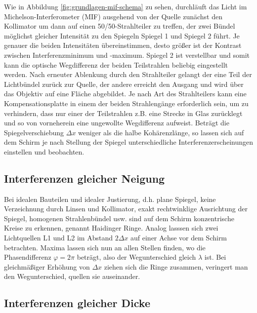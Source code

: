		Wie in Abbildung \ref{fig:grundlagen-mif-schema} zu sehen, durchläuft das Licht im Michelson-Interferometer (MIF) ausgehend von der Quelle zunächst den Kollimator um dann auf einen 50/50-Strahlteiler zu treffen, der zwei Bündel möglichst gleicher Intensität zu den Spiegeln Spiegel 1 und Spiegel 2 führt.
		Je genauer die beiden Intensitäten übereinstimmen, desto größer ist der Kontrast zwischen Interferenzminimum und -maximum. 
		Spiegel 2 ist verstellbar und somit kann die optische Wegdifferenz der beiden Teilstrahlen beliebig eingestellt werden.
		Nach erneuter Ablenkung durch den Strahlteiler gelangt der eine Teil der Lichtbündel zurück zur Quelle, der andere erreicht den Ausgang und wird über das Objektiv auf eine Fläche abgebildet.
		Je nach Art des Strahlteilers kann eine Kompensationsplatte in einem der beiden Strahlengänge erforderlich sein, um zu verhindern, dass nur einer der Teilstrahlen z.B. eine Strecke in Glas zurücklegt und so von vorneherein eine ungewollte Wegdifferenz aufweist.
		Beträgt die Spiegelverschiebung $\Delta x$ weniger als die halbe Kohärenzlänge, so lassen sich auf dem Schirm je nach Stellung der Spiegel unterschiedliche Interferenzerscheinungen einstellen und beobachten.
	

	\subsection{Interferenzen gleicher Neigung} %
	\label{sub:interferenzen_gleicher_neigung_haidinger_ringe}

		Bei idealen Bauteilen und idealer Justierung, d.h. plane Spiegel, keine Verzeichnung durch Linsen und Kollimator, exakt rechtwinklige Ausrichtung der Spiegel, homogenen Strahlenbündel usw. sind auf dem Schirm konzentrische Kreise zu erkennen, genannt Haidinger Ringe.
		Analog lasssen sich zwei Lichtquellen L1 und L2 im Abstand $2 \Delta x$ auf einer Achse vor dem Schirm betrachten.
		Maxima lassen sich nun an allen Stellen finden, wo die Phasendifferenz $\varphi = 2 \pi$ beträgt, also der Wegunterschied gleich $\lambda$ ist.
		Bei gleichmäßiger Erhöhung von $\Delta x$ ziehen sich die Ringe zusammen, veringert man den Wegunterschied, quellen sie auseinander.



	\subsection{Interferenzen gleicher Dicke} %
	\label{sub:interferenzen_gleicher_dicke_fizeau_streifen}
	
